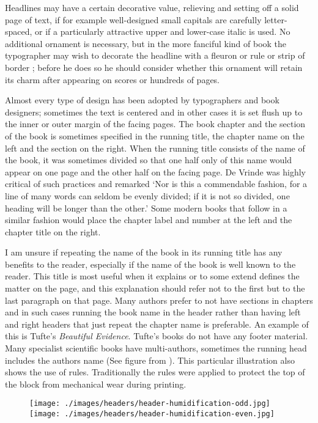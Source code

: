 Headlines may have a certain decorative value, relieving and setting off
a solid page of text, if for example well-designed small capitals are carefully
letter-spaced, or if a particularly attractive upper and lower-case
italic is used. No additional ornament is necessary, but in the more fanciful
kind of book the typographer may wish to decorate the headline with a
fleuron or rule or strip of border ; before he does so he should consider
whether this ornament will retain its charm after appearing on scores or
hundreds of pages.

Almost every type of design has been adopted by typographers and book designers; sometimes the text is centered and in other cases it is set flush up to the inner or outer margin of the facing pages. The book chapter and the section of the book is sometimes specified in the running title, the chapter name on the left and the section on the right. When the running title consists of the name of the book, it was sometimes divided so that one half only of this name would appear on one page and the other half on the facing page. De Vrinde was highly critical of such practices and remarked `Nor is this a commendable fashion, for a line of many words can seldom be evenly divided; if it is not so divided, one heading will be longer than the other.’  Some modern books that follow in a similar fashion would place the chapter label and number at the left and the chapter title on the right. 

I am unsure if repeating the name of the book in its running title has any benefits to the reader, especially if the name of the book is well known to the reader. This title is most useful when it explains or to some extend defines the matter on the page, and this explanation should refer not to the first but to the last paragraph on that page.  Many authors prefer to not have sections in chapters and in such cases running the book name in the header rather than having left and right headers that just repeat the chapter name is preferable. An example of this is Tufte’s \textit{Beautiful Evidence}.  Tufte’s books do not have any footer material.  Many specialist scientific books have multi-authors, sometimes the running head includes the authors name (See figure from ). This particular illustration also shows the use of rules. Traditionally the rules were applied to protect the top of the block from mechanical wear during printing. 

\begin{figure}[hb]
\texttt{[image: ./images/headers/header-humidification-odd.jpg]}
\texttt{[image: ./images/headers/header-humidification-even.jpg]}
\end{figure}



